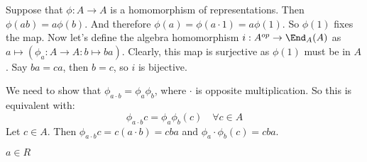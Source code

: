 Suppose that $\phi: A \to A$ is a homomorphism of representations. Then $\phi(ab)=a\phi(b)$.
And therefore $\phi(a)=\phi(a\cdot 1)=a\phi(1)$. So $\phi(1)$ fixes the map. Now let's define the algebra homomorphism $i : A^{op} \to \End_A(A) $ as $a \mapsto (\phi_a: A\to A: b \mapsto ba)$. Clearly, this map is surjective as $\phi(1)$ must be in $A$. Say $ba = ca$, then $b=c$, so $i$ is bijective.

We need to show that  $\phi_{a\cdot b}=\phi_a \phi_b$, where $\cdot$ is opposite multiplication. So this is equivalent with:
\[\phi_{a\cdot b}c = \phi_a \phi_b(c) \quad \forall c \in A \]
Let $c\in A$. Then $\phi_{a\cdot b}c = c(a\cdot b)=cba$ and $\phi_a \cdot \phi_b (c)= cba$.

$a∈R$